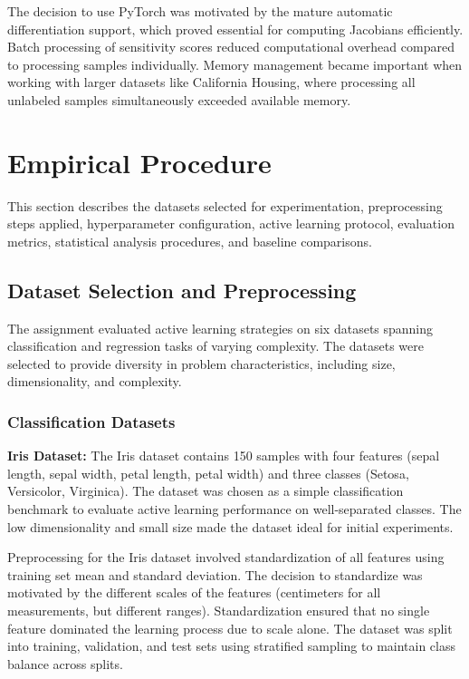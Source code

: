 \documentclass[conference]{IEEEtran}
\begin{document}
The decision to use PyTorch was motivated by the mature automatic differentiation support, which proved essential for computing Jacobians efficiently. Batch processing of sensitivity scores reduced computational overhead compared to processing samples individually. Memory management became important when working with larger datasets like California Housing, where processing all unlabeled samples simultaneously exceeded available memory.

\section{Empirical Procedure}

This section describes the datasets selected for experimentation, preprocessing steps applied, hyperparameter configuration, active learning protocol, evaluation metrics, statistical analysis procedures, and baseline comparisons.

\subsection{Dataset Selection and Preprocessing}

The assignment evaluated active learning strategies on six datasets spanning classification and regression tasks of varying complexity. The datasets were selected to provide diversity in problem characteristics, including size, dimensionality, and complexity.

\subsubsection{Classification Datasets}

\textbf{Iris Dataset:}
The Iris dataset contains 150 samples with four features (sepal length, sepal width, petal length, petal width) and three classes (Setosa, Versicolor, Virginica). The dataset was chosen as a simple classification benchmark to evaluate active learning performance on well-separated classes. The low dimensionality and small size made the dataset ideal for initial experiments.

Preprocessing for the Iris dataset involved standardization of all features using training set mean and standard deviation. The decision to standardize was motivated by the different scales of the features (centimeters for all measurements, but different ranges). Standardization ensured that no single feature dominated the learning process due to scale alone. The dataset was split into training, validation, and test sets using stratified sampling to maintain class balance across splits.
\end{document}

